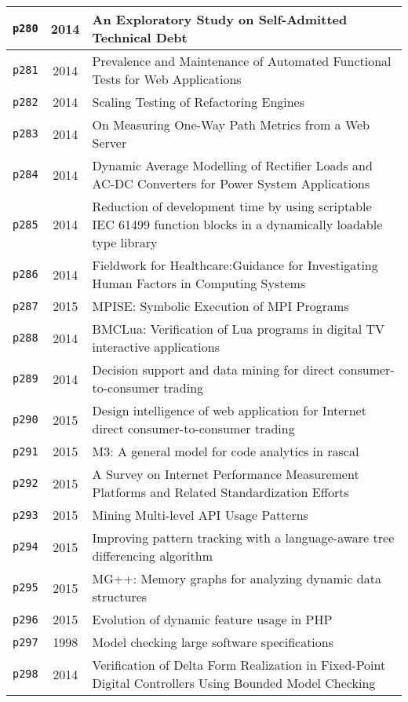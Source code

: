 \begin{longtable}{| c | c | p{16cm} |}
  \hline
  \texttt{p280} & 2014 & An Exploratory Study on Self-Admitted Technical Debt \\
  \hline
  \texttt{p281} & 2014 & Prevalence and Maintenance of Automated Functional Tests for Web Applications \\
  \hline
  \texttt{p282} & 2014 & Scaling Testing of Refactoring Engines \\
  \hline
  \texttt{p283} & 2014 & On Measuring One-Way Path Metrics from a Web Server \\
  \hline
  \texttt{p284} & 2014 & Dynamic Average Modelling of Rectifier Loads and AC-DC Converters for Power System Applications \\
  \hline
  \texttt{p285} & 2014 & Reduction of development time by using scriptable IEC 61499 function blocks in a dynamically loadable type library \\
  \hline
  \texttt{p286} & 2014 & Fieldwork for Healthcare:Guidance for Investigating Human Factors in Computing Systems \\
  \hline
  \texttt{p287} & 2015 & MPISE: Symbolic Execution of MPI Programs \\
  \hline
  \texttt{p288} & 2014 & BMCLua: Verification of Lua programs in digital TV interactive applications \\
  \hline
  \texttt{p289} & 2014 & Decision support and data mining for direct consumer-to-consumer trading \\
  \hline
  \texttt{p290} & 2015 & Design intelligence of web application for Internet direct consumer-to-consumer trading \\
  \hline
  \texttt{p291} & 2015 & M3: A general model for code analytics in rascal \\
  \hline
  \texttt{p292} & 2015 & A Survey on Internet Performance Measurement Platforms and Related Standardization Efforts \\
  \hline
  \texttt{p293} & 2015 & Mining Multi-level API Usage Patterns \\
  \hline
  \texttt{p294} & 2015 & Improving pattern tracking with a language-aware tree differencing algorithm \\
  \hline
  \texttt{p295} & 2015 & MG++: Memory graphs for analyzing dynamic data structures \\
  \hline
  \texttt{p296} & 2015 & Evolution of dynamic feature usage in PHP \\
  \hline
  \texttt{p297} & 1998 & Model checking large software specifications \\
  \hline
  \texttt{p298} & 2014 & Verification of Delta Form Realization in Fixed-Point Digital Controllers Using Bounded Model Checking \\

\end{longtable}
